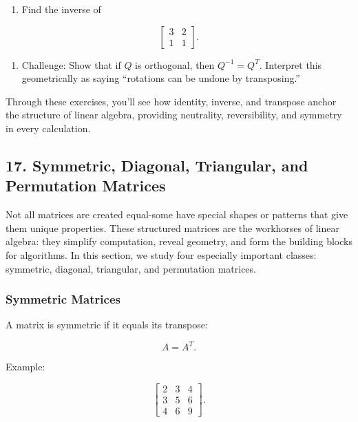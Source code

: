 \documentclass[
  letterpaper,
  DIV=11,
  numbers=noendperiod]{scrreprt}
\providecommand{\tightlist}{%
  \setlength{\itemsep}{0pt}\setlength{\parskip}{0pt}}
\begin{document}
\begin{enumerate}
\def\labelenumi{\arabic{enumi}.}
\setcounter{enumi}{2}
\tightlist
\item
  Find the inverse of
\end{enumerate}

\[
\begin{bmatrix} 
3 & 2 \\ 
1 & 1 
\end{bmatrix}.
\]

\begin{enumerate}
\def\labelenumi{\arabic{enumi}.}
\setcounter{enumi}{3}
\tightlist
\item
  Challenge: Show that if \(Q\) is orthogonal, then \(Q^{-1} = Q^T\).
  Interpret this geometrically as saying ``rotations can be undone by
  transposing.''
\end{enumerate}

Through these exercises, you'll see how identity, inverse, and transpose
anchor the structure of linear algebra, providing neutrality,
reversibility, and symmetry in every calculation.

\subsection{17. Symmetric, Diagonal, Triangular, and Permutation
Matrices}\label{symmetric-diagonal-triangular-and-permutation-matrices}

Not all matrices are created equal-some have special shapes or patterns
that give them unique properties. These structured matrices are the
workhorses of linear algebra: they simplify computation, reveal
geometry, and form the building blocks for algorithms. In this section,
we study four especially important classes: symmetric, diagonal,
triangular, and permutation matrices.

\subsubsection{Symmetric Matrices}\label{symmetric-matrices}

A matrix is symmetric if it equals its transpose:

\[
A = A^T.
\]

Example:

\[
\begin{bmatrix} 
2 & 3 & 4 \\ 
3 & 5 & 6 \\ 
4 & 6 & 9 
\end{bmatrix}.
\]
\end{document}
